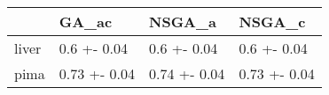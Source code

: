 \begin{tabular}{llll}
\toprule
{} &         GA\_ac &        NSGA\_a &        NSGA\_c \\
\midrule
liver &   0.6 +- 0.04 &   0.6 +- 0.04 &   0.6 +- 0.04 \\
pima  &  0.73 +- 0.04 &  0.74 +- 0.04 &  0.73 +- 0.04 \\
\bottomrule
\end{tabular}
